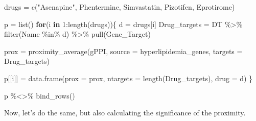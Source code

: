 \documentclass[
]{book}
\newenvironment{Shaded}{\begin{snugshade}}{\end{snugshade}}
\newcommand{\AttributeTok}[1]{\textcolor[rgb]{0.77,0.63,0.00}{#1}}
\newcommand{\ControlFlowTok}[1]{\textcolor[rgb]{0.13,0.29,0.53}{\textbf{#1}}}
\newcommand{\DecValTok}[1]{\textcolor[rgb]{0.00,0.00,0.81}{#1}}
\newcommand{\FunctionTok}[1]{\textcolor[rgb]{0.00,0.00,0.00}{#1}}
\newcommand{\NormalTok}[1]{#1}
\newcommand{\OtherTok}[1]{\textcolor[rgb]{0.56,0.35,0.01}{#1}}
\newcommand{\SpecialCharTok}[1]{\textcolor[rgb]{0.00,0.00,0.00}{#1}}
\newcommand{\StringTok}[1]{\textcolor[rgb]{0.31,0.60,0.02}{#1}}
\begin{document}
\begin{Shaded}
\begin{Highlighting}[]
\NormalTok{drugs }\OtherTok{=} \FunctionTok{c}\NormalTok{(}\StringTok{"Asenapine"}\NormalTok{, }
          \StringTok{\textquotesingle{}Phentermine\textquotesingle{}}\NormalTok{, }
          \StringTok{\textquotesingle{}Simvastatin\textquotesingle{}}\NormalTok{, }
          \StringTok{\textquotesingle{}Pizotifen\textquotesingle{}}\NormalTok{,}
          \StringTok{\textquotesingle{}Eprotirome\textquotesingle{}}\NormalTok{)}

\NormalTok{p }\OtherTok{=} \FunctionTok{list}\NormalTok{()}
\ControlFlowTok{for}\NormalTok{(i }\ControlFlowTok{in} \DecValTok{1}\SpecialCharTok{:}\FunctionTok{length}\NormalTok{(drugs))\{}
\NormalTok{  d }\OtherTok{=}\NormalTok{ drugs[i]}
\NormalTok{  Drug\_targets }\OtherTok{=}\NormalTok{ DT }\SpecialCharTok{\%\textgreater{}\%} 
    \FunctionTok{filter}\NormalTok{(Name }\SpecialCharTok{\%in\%}\NormalTok{ d) }\SpecialCharTok{\%\textgreater{}\%}
    \FunctionTok{pull}\NormalTok{(Gene\_Target)}
  
\NormalTok{  prox }\OtherTok{=} \FunctionTok{proximity\_average}\NormalTok{(gPPI, }
                           \AttributeTok{source =}\NormalTok{ hyperlipidemia\_genes, }
                           \AttributeTok{targets =}\NormalTok{ Drug\_targets)}
  
\NormalTok{  p[[i]] }\OtherTok{=} \FunctionTok{data.frame}\NormalTok{(}\AttributeTok{prox =}\NormalTok{ prox, }
                      \AttributeTok{ntargets =} \FunctionTok{length}\NormalTok{(Drug\_targets), }
                      \AttributeTok{drug =}\NormalTok{ d)}
\NormalTok{\}}

\NormalTok{p }\SpecialCharTok{\%\textless{}\textgreater{}\%} \FunctionTok{bind\_rows}\NormalTok{()}
\end{Highlighting}
\end{Shaded}

Now, let's do the same, but also calculating the significance of the proximity.
\end{document}
